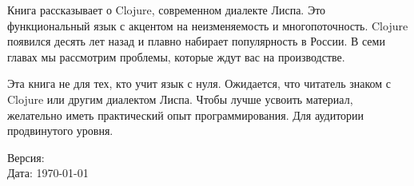 \thispagestyle{empty}

\small

Книга рассказывает о Clojure, современном диалекте Лиспа. Это функциональный
язык с акцентом на неизменяемость и многопоточность. Clojure появился десять лет
назад и плавно набирает популярность в России. В семи главах мы рассмотрим
проблемы, которые ждут вас на производстве.

Эта книга не для тех, кто учит язык с нуля. Ожидается, что читатель знаком с
Clojure или другим диалектом Лиспа. Чтобы лучше усвоить материал, желательно
иметь практический опыт программирования. Для аудитории продвинутого уровня.

\normalfont

\vspace{5em}

\noindent
Версия: \\
Дата: \today
